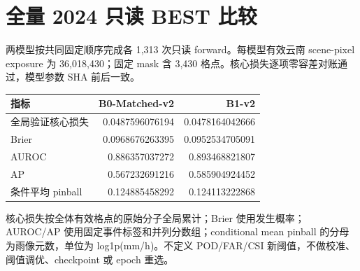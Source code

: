 \documentclass[UTF8,a4paper,11pt,fontset=windows]{ctexart}
\begin{document}
\section{全量 2024 只读 BEST 比较}
两模型按共同固定顺序完成各 1,313 次只读 forward。每模型有效云南 scene-pixel exposure 为 36,018,430；固定 mask 含 3,430 格点。核心损失逐项零容差对账通过，模型参数 SHA 前后一致。
\par\noindent\begin{tabular}{lrr}\toprule 指标 & B0-Matched-v2 & B1-v2\\\midrule
全局验证核心损失 & 0.0487596076194 & 0.0478164042666\\
Brier & 0.0968676263395 & 0.0952534705091\\
AUROC & 0.886357037272 & 0.893468821807\\
AP & 0.567232691216 & 0.585904924452\\
条件平均 pinball & 0.124885458292 & 0.124113222868\\
\bottomrule\end{tabular}\par
核心损失按全体有效格点的原始分子全局累计；Brier 使用发生概率；AUROC/AP 使用固定事件标签和并列分数组；conditional mean pinball 的分母为雨像元数，单位为 log1p(mm/h)。不定义 POD/FAR/CSI 新阈值，不做校准、阈值调优、checkpoint 或 epoch 重选。
\end{document}
